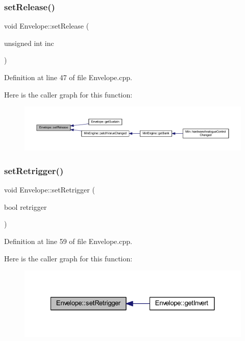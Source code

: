 \subsubsection{\texorpdfstring{set\+Release()}{setRelease()}}
{\footnotesize\ttfamily void Envelope\+::set\+Release (\begin{DoxyParamCaption}\item[{unsigned int}]{inc }\end{DoxyParamCaption})}



Definition at line 47 of file Envelope.\+cpp.

Here is the caller graph for this function\+:
\nopagebreak
\begin{figure}[H]
\begin{center}
\leavevmode
\includegraphics[width=350pt]{d7/df3/class_envelope_a7102e88984b79766c6e9dc4a3c7e278d_icgraph}
\end{center}
\end{figure}
\mbox{\label{class_envelope_a88691c37c715df009f27de4ff156679f}} 
\subsubsection{\texorpdfstring{set\+Retrigger()}{setRetrigger()}}
{\footnotesize\ttfamily void Envelope\+::set\+Retrigger (\begin{DoxyParamCaption}\item[{bool}]{retrigger }\end{DoxyParamCaption})}



Definition at line 59 of file Envelope.\+cpp.

Here is the caller graph for this function\+:
\nopagebreak
\begin{figure}[H]
\begin{center}
\leavevmode
\includegraphics[width=328pt]{d7/df3/class_envelope_a88691c37c715df009f27de4ff156679f_icgraph}
\end{center}
\end{figure}
\mbox{\label{class_envelope_adb5198f773dffea346cbfda055556e69}} 
